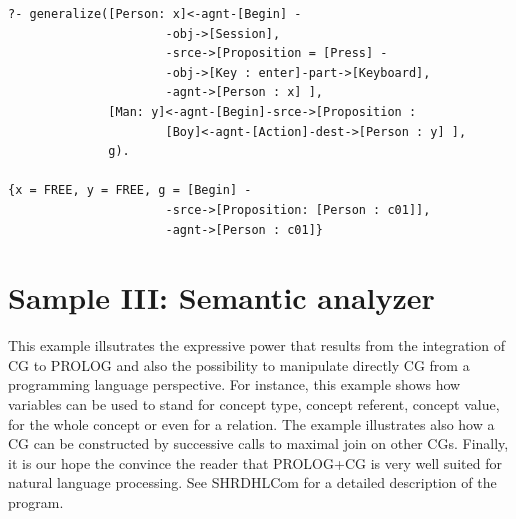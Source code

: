 \documentclass{book}
\begin{document}
\begin{verbatim}
?- generalize([Person: x]<-agnt-[Begin] -
                      -obj->[Session],
                      -srce->[Proposition = [Press] -
                      -obj->[Key : enter]-part->[Keyboard],
                      -agnt->[Person : x] ],
              [Man: y]<-agnt-[Begin]-srce->[Proposition : 
                      [Boy]<-agnt-[Action]-dest->[Person : y] ],
              g).

{x = FREE, y = FREE, g = [Begin] -
                      -srce->[Proposition: [Person : c01]],
                      -agnt->[Person : c01]}
\end{verbatim}





\section{Sample III: Semantic analyzer}\label{Sec:SampleIII}

This example illsutrates the expressive power that results from the
integration of CG to PROLOG and also the possibility to manipulate
directly CG from a programming language perspective. For instance,
this example shows how variables can be used to stand for concept
type, concept referent, concept value, for the whole concept or even
for a relation. The example illustrates also how a CG can be
constructed by successive calls to maximal join on other CGs. Finally,
it is our hope the convince the reader that PROLOG+CG is very well
suited for natural language processing. See SHRDHLCom for a detailed
description of the program.
\end{document}
